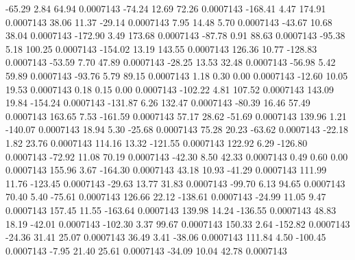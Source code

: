       -65.29        2.84       64.94     0.0007143
      -74.24       12.69       72.26     0.0007143
     -168.41        4.47      174.91     0.0007143
       38.06       11.37      -29.14     0.0007143
        7.95       14.48        5.70     0.0007143
      -43.67       10.68       38.04     0.0007143
     -172.90        3.49      173.68     0.0007143
      -87.78        0.91       88.63     0.0007143
      -95.38        5.18      100.25     0.0007143
     -154.02       13.19      143.55     0.0007143
      126.36       10.77     -128.83     0.0007143
      -53.59        7.70       47.89     0.0007143
      -28.25       13.53       32.48     0.0007143
      -56.98        5.42       59.89     0.0007143
      -93.76        5.79       89.15     0.0007143
        1.18        0.30        0.00     0.0007143
      -12.60       10.05       19.53     0.0007143
        0.18        0.15        0.00     0.0007143
     -102.22        4.81      107.52     0.0007143
      143.09       19.84     -154.24     0.0007143
     -131.87        6.26      132.47     0.0007143
      -80.39       16.46       57.49     0.0007143
      163.65        7.53     -161.59     0.0007143
       57.17       28.62      -51.69     0.0007143
      139.96        1.21     -140.07     0.0007143
       18.94        5.30      -25.68     0.0007143
       75.28       20.23      -63.62     0.0007143
      -22.18        1.82       23.76     0.0007143
      114.16       13.32     -121.55     0.0007143
      122.92        6.29     -126.80     0.0007143
      -72.92       11.08       70.19     0.0007143
      -42.30        8.50       42.33     0.0007143
        0.49        0.60        0.00     0.0007143
      155.96        3.67     -164.30     0.0007143
       43.18       10.93      -41.29     0.0007143
      111.99       11.76     -123.45     0.0007143
      -29.63       13.77       31.83     0.0007143
      -99.70        6.13       94.65     0.0007143
       70.40        5.40      -75.61     0.0007143
      126.66       22.12     -138.61     0.0007143
      -24.99       11.05        9.47     0.0007143
      157.45       11.55     -163.64     0.0007143
      139.98       14.24     -136.55     0.0007143
       48.83       18.19      -42.01     0.0007143
     -102.30        3.37       99.67     0.0007143
      150.33        2.64     -152.82     0.0007143
      -24.36       31.41       25.07     0.0007143
       36.49        3.41      -38.06     0.0007143
      111.84        4.50     -100.45     0.0007143
       -7.95       21.40       25.61     0.0007143
      -34.09       10.04       42.78     0.0007143
